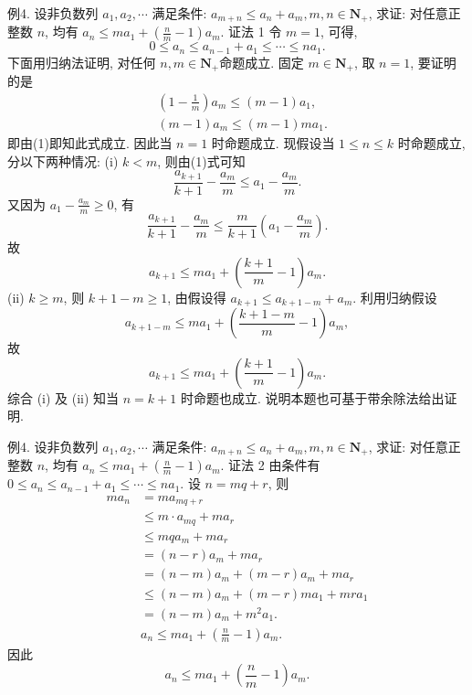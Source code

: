 例4. 设非负数列 $a_1, a_2, \cdots$ 满足条件: $a_{m+n} \leqslant a_n+a_m, m, n \in \mathbf{N}_{+}$, 求证: 对任意正整数 $n$, 均有 $a_n \leqslant m a_1+\left(\frac{n}{m}-1\right) a_m$.
证法 1 令 $m=1$, 可得,
$$
0 \leqslant a_n \leqslant a_{n-1}+a_1 \leqslant \cdots \leqslant n a_1 . \label{(1)}
$$
下面用归纳法证明, 对任何 $n, m \in \mathbf{N}_{+}$命题成立.
固定 $m \in \mathbf{N}_{+}$, 取 $n=1$, 要证明的是
$$
\begin{aligned}
& \left(1-\frac{1}{m}\right) a_m \leqslant(m-1) a_1, \\
& (m-1) a_m \leqslant(m-1) m a_1 .
\end{aligned}
$$
即由(1)即知此式成立.
因此当 $n=1$ 时命题成立.
现假设当 $1 \leqslant n \leqslant k$ 时命题成立, 分以下两种情况:
(i) $k<m$, 则由(1)式可知
$$
\frac{a_{k+1}}{k+1}-\frac{a_m}{m} \leqslant a_1-\frac{a_m}{m} .
$$
又因为 $a_1-\frac{a_m}{m} \geqslant 0$, 有
$$
\frac{a_{k+1}}{k+1}-\frac{a_m}{m} \leqslant \frac{m}{k+1}\left(a_1-\frac{a_m}{m}\right) .
$$
故
$$
a_{k+1} \leqslant m a_1+\left(\frac{k+1}{m}-1\right) a_m .
$$
(ii) $k \geqslant m$, 则 $k+1-m \geqslant 1$, 由假设得 $a_{k+1} \leqslant a_{k+1-m}+a_m$.
利用归纳假设
$$
a_{k+1-m} \leqslant m a_1+\left(\frac{k+1-m}{m}-1\right) a_m,
$$
故
$$
a_{k+1} \leqslant m a_1+\left(\frac{k+1}{m}-1\right) a_m .
$$
综合 (i) 及 (ii) 知当 $n=k+1$ 时命题也成立.
说明本题也可基于带余除法给出证明.



例4. 设非负数列 $a_1, a_2, \cdots$ 满足条件: $a_{m+n} \leqslant a_n+a_m, m, n \in \mathbf{N}_{+}$, 求证: 对任意正整数 $n$, 均有 $a_n \leqslant m a_1+\left(\frac{n}{m}-1\right) a_m$.
证法 2 由条件有 $0 \leqslant a_n \leqslant a_{n-1}+a_1 \leqslant \cdots \leqslant n a_1$.
设 $n=m q+r$, 则
$$
\begin{aligned}
m a_n & =m a_{m q+r} \\
& \leqslant m \cdot a_{m q}+m a_r \\
& \leqslant m q a_m+m a_r \\
& =(n-r) a_m+m a_r \\
& =(n-m) a_m+(m-r) a_m+m a_r \\
& \leqslant(n-m) a_m+(m-r) m a_1+m r a_1 \\
& =(n-m) a_m+m^2 a_1 . \\
& a_n \leqslant m a_1+\left(\frac{n}{m}-1\right) a_m .
\end{aligned}
$$
因此
$$
a_n \leqslant m a_1+\left(\frac{n}{m}-1\right) a_m .
$$



